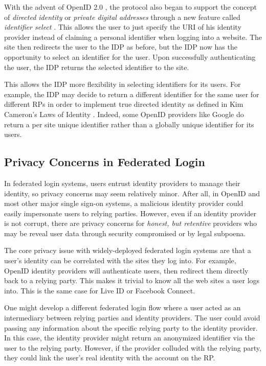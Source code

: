 \documentclass{llncs}
\begin{document}
With the advent of OpenID 2.0 \cite{OID2}, the protocol also began to
support the concept of \emph{directed identity} \cite{Cam06} or
\emph{private digital addresses} through a new feature called
\emph{identifier select} \cite{RR06}.  This allows the user to just
specify the URI of his identity provider instead of claiming a
personal identifier when logging into a website. The site then
redirects the user to the IDP as before, but the IDP now has the
opportunity to select an identifier for the user. Upon successfully
authenticating the user, the IDP returns the selected identifier to
the site.

This allows the IDP more flexibility in selecting identifiers for its
users. For example, the IDP may decide to return a different
identifier for the same user for different RPs in order to implement
true directed identity as defined in Kim Cameron's Laws of Identity
\cite{Cam06}. Indeed, some OpenID providers like Google do return a
per site unique identifier rather than a globally unique identifier
for its users.

\subsection{Privacy Concerns in Federated Login}

In federated login systems, users entrust identity providers to manage
their identity, so privacy concerns may seem relatively minor. After
all, in OpenID and most other major single sign-on systems, a
malicious identity provider could easily impersonate users to relying
parties. However, even if an identity provider is not corrupt, there
are privacy concerns for \emph{honest, but retentive} providers who
may be reveal user data through security compromised or by legal
subpoena.

The core privacy issue with widely-deployed federated login systems
are that a user's identity can be correlated with the sites they log
into. For example, OpenID identity providers will authenticate users,
then redirect them directly back to a relying party. This makes it
trivial to know all the web sites a user logs into. This is the same
case for Live ID or Facebook Connect.

One might develop a different federated login flow where a user acted
as an intermediary between relying parties and identity providers. The
user could avoid passing any information about the specific relying
party to the identity provider. In this case, the identity provider
might return an anonymized identifier via the user to the relying
party. However, if the provider colluded with the relying party, they
could link the user's real identity with the account on the RP.
\end{document}
